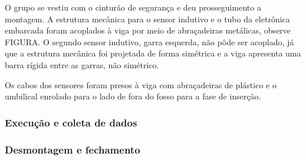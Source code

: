 O grupo se vestiu com o cinturão de segurança e deu prosseguimento a
montagem. A estrutura mecânica para o sensor indutivo e o
tubo da eletrônica embarcada foram acoplados à viga por meio de abraçadeiras
metálicas, observe FIGURA. O segundo sensor indutivo, garra esquerda, não pôde
ser acoplado, já que a estrutura mecânica foi projetada de forma simétrica e a
viga apresenta uma barra rígida entre as garras, não simétrico.

Os cabos dos sensores foram presos à viga com abraçadeiras de plástico e o
umbilical enrolado para o lado de fora do fosso para a fase de inserção.



\subsubsection{Execução e coleta de dados}
\subsubsection{Desmontagem e fechamento}

\label{metodos}


